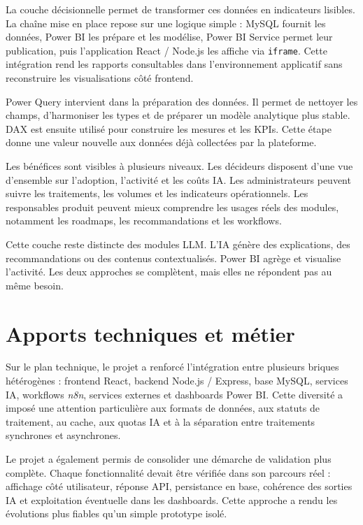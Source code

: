 La couche décisionnelle permet de transformer ces données en indicateurs lisibles. La chaîne mise en place repose sur une logique simple : MySQL fournit les données, Power BI les prépare et les modélise, Power BI Service permet leur publication, puis l'application React / Node.js les affiche via \texttt{iframe}. Cette intégration rend les rapports consultables dans l'environnement applicatif sans reconstruire les visualisations côté frontend.

Power Query intervient dans la préparation des données. Il permet de nettoyer les champs, d'harmoniser les types et de préparer un modèle analytique plus stable. DAX est ensuite utilisé pour construire les mesures et les KPIs. Cette étape donne une valeur nouvelle aux données déjà collectées par la plateforme.

Les bénéfices sont visibles à plusieurs niveaux. Les décideurs disposent d'une vue d'ensemble sur l'adoption, l'activité et les coûts IA. Les administrateurs peuvent suivre les traitements, les volumes et les indicateurs opérationnels. Les responsables produit peuvent mieux comprendre les usages réels des modules, notamment les roadmaps, les recommandations et les workflows.

Cette couche reste distincte des modules LLM. L'IA génère des explications, des recommandations ou des contenus contextualisés. Power BI agrège et visualise l'activité. Les deux approches se complètent, mais elles ne répondent pas au même besoin.

\section{Apports techniques et métier}

Sur le plan technique, le projet a renforcé l'intégration entre plusieurs briques hétérogènes : frontend React, backend Node.js / Express, base MySQL, services IA, workflows \textit{n8n}, services externes et dashboards Power BI. Cette diversité a imposé une attention particulière aux formats de données, aux statuts de traitement, au cache, aux quotas IA et à la séparation entre traitements synchrones et asynchrones.

Le projet a également permis de consolider une démarche de validation plus complète. Chaque fonctionnalité devait être vérifiée dans son parcours réel : affichage côté utilisateur, réponse API, persistance en base, cohérence des sorties IA et exploitation éventuelle dans les dashboards. Cette approche a rendu les évolutions plus fiables qu'un simple prototype isolé.

